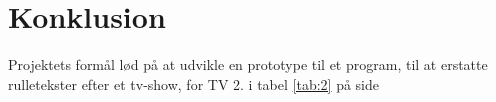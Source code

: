 \section{Konklusion}
Projektets formål lød på at udvikle en prototype til et program, til at erstatte rulletekster efter et tv-show, for TV 2. i tabel \ref{tab:2} på side \pageref{tab:2}